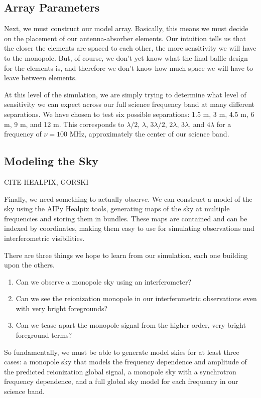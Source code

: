 \subsection{Array Parameters}

Next, we must construct our model array. Basically, this means we must decide 
on the placement of our antenna-absorber elements. Our intuition tells us that 
the closer the elements are spaced to each other, the more sensitivity we will 
have to the monopole. But, of course, we don't yet know what the final baffle 
design for the elements is, and therefore we don't know how much space we will 
have to leave between elements.

At this level of the simulation, we are simply trying to determine what level 
of sensitivity we can expect across our full science frequency band at many 
different separations. We have chosen to test six possible separations: 1.5 m, 
3 m, 4.5 m, 6 m, 9 m, and 12 m. This corresponds to $\lambda/2$, $\lambda$, 
  $3\lambda/2$, $2\lambda$, $3\lambda$, and $4\lambda$ for a frequency of $\nu 
  = 100$ MHz, approximately the center of our science band.

\subsection{Modeling the Sky}

CITE HEALPIX, GORSKI

Finally, we need something to actually observe. We can construct a model of the 
sky using the AIPy Healpix tools, generating maps of the sky at multiple 
frequencies and storing them in bundles. These maps are contained and can be 
indexed by coordinates, making them easy to use for simulating observations and 
interferometric visibilities.

There are three things we hope to learn from our simulation, each one building 
upon the others.
\begin{enumerate}
 \item Can we observe a monopole sky using an interferometer?
 \item Can we see the reionization monopole in our interferometric observations 
  even with very bright foregrounds?
 \item Can we tease apart the monopole signal from the higher order, very 
  bright foreground terms?
\end{enumerate}

So fundamentally, we must be able to generate model skies for at least three 
cases: a monopole sky that models the frequency dependence and amplitude of the 
predicted reionization global signal, a monopole sky with a synchrotron 
frequency dependence, and a full global sky model for each frequency in our 
science band.

